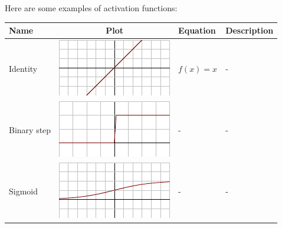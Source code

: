 Here are some examples of activation functions:

\begin{tabular}{| p{25mm} | c | l | l |}

\hline

Name & Plot & Equation & Description \\

\hline

Identity & \begin{minipage}{.2\textwidth}
      \includegraphics[width=\textwidth]{tex/images/activation/identity}
    \end{minipage} & $f(x) = x$ & - \\
      
Binary step & \begin{minipage}{.2\textwidth}
      \includegraphics[width=\textwidth]{tex/images/activation/binstep}
    \end{minipage} & - & -  \\
    
Sigmoid & \begin{minipage}{.2\textwidth}
      \includegraphics[width=\textwidth]{tex/images/activation/sigmoid}
    \end{minipage} & - & - \\


\end{tabular}
